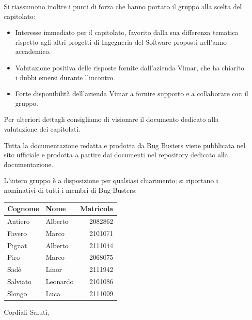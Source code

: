 \documentclass[a4paper,11pt]{letter}
\begin{document}
\begin{letter}
\vspace{1em}

Si riassumono inoltre i punti di forza che hanno portato il gruppo alla scelta del capitolato:

\begin{itemize}
    \item Interesse immediato per il capitolato, favorito dalla sua differenza tematica rispetto agli altri progetti di Ingegneria del Software proposti nell'anno accademico.
    
    \item Valutazione positiva delle risposte fornite dall'azienda Vimar, che ha chiarito i dubbi emersi durante l'incontro.
    
    \item Forte disponibilità dell'azienda Vimar a fornire supporto e a collaborare con il gruppo.
\end{itemize}

\vspace{1em}

Per ulteriori dettagli consigliamo di visionare il documento dedicato alla valutazione dei capitolati.

\newpage

Tutta la documentazione redatta e prodotta da Bug Busters viene pubblicata nel sito ufficiale e prodotta a partire dai documenti nel repository dedicato alla documentazione.

\vspace{1em}

L'intero gruppo è a disposizione per qualsiasi chiarimento; si riportano i nominativi di tutti i membri di Bug Busters:

\vspace{1em}

\begin{center}
\begin{tabular}{|l|l|r|}
\hline
\textbf{Cognome} & \textbf{Nome} & \textbf{Matricola} \\
\hline
Autiero & Alberto & 2082862 \\
\hline
Favero & Marco & 2101071 \\
\hline
Pignat & Alberto & 2111044 \\
\hline
Piro & Marco & 2068075 \\
\hline
Sadè & Linor & 2111942 \\
\hline
Salviato & Leonardo & 2101086 \\
\hline
Slongo & Luca & 2111009 \\
\hline
\end{tabular}
\end{center}

\vspace{2em}

\closing{Cordiali Saluti,}

\end{letter}
\end{document}
